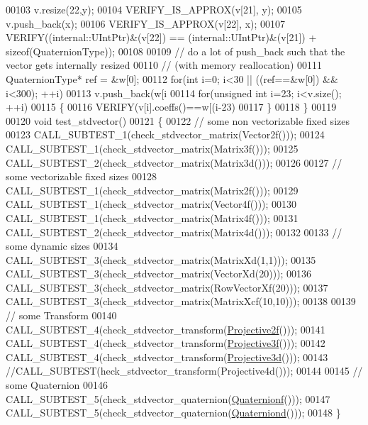 \begin{DoxyCode}
00103   v.resize(22,y);
00104   VERIFY\_IS\_APPROX(v[21], y);
00105   v.push\_back(x);
00106   VERIFY\_IS\_APPROX(v[22], x);
00107   VERIFY((internal::UIntPtr)&(v[22]) == (internal::UIntPtr)&(v[21]) + \textcolor{keyword}{sizeof}(QuaternionType));
00108 
00109   \textcolor{comment}{// do a lot of push\_back such that the vector gets internally resized}
00110   \textcolor{comment}{// (with memory reallocation)}
00111   QuaternionType* ref = &w[0];
00112   \textcolor{keywordflow}{for}(\textcolor{keywordtype}{int} i=0; i<30 || ((ref==&w[0]) && i<300); ++i)
00113     v.push\_back(w[i%
00114   \textcolor{keywordflow}{for}(\textcolor{keywordtype}{unsigned} \textcolor{keywordtype}{int} i=23; i<v.size(); ++i)
00115   \{
00116     VERIFY(v[i].coeffs()==w[(i-23)%
00117   \}
00118 \}
00119 
00120 \textcolor{keywordtype}{void} test\_stdvector()
00121 \{
00122   \textcolor{comment}{// some non vectorizable fixed sizes}
00123   CALL\_SUBTEST\_1(check\_stdvector\_matrix(Vector2f()));
00124   CALL\_SUBTEST\_1(check\_stdvector\_matrix(Matrix3f()));
00125   CALL\_SUBTEST\_2(check\_stdvector\_matrix(Matrix3d()));
00126 
00127   \textcolor{comment}{// some vectorizable fixed sizes}
00128   CALL\_SUBTEST\_1(check\_stdvector\_matrix(Matrix2f()));
00129   CALL\_SUBTEST\_1(check\_stdvector\_matrix(Vector4f()));
00130   CALL\_SUBTEST\_1(check\_stdvector\_matrix(Matrix4f()));
00131   CALL\_SUBTEST\_2(check\_stdvector\_matrix(Matrix4d()));
00132 
00133   \textcolor{comment}{// some dynamic sizes}
00134   CALL\_SUBTEST\_3(check\_stdvector\_matrix(MatrixXd(1,1)));
00135   CALL\_SUBTEST\_3(check\_stdvector\_matrix(VectorXd(20)));
00136   CALL\_SUBTEST\_3(check\_stdvector\_matrix(RowVectorXf(20)));
00137   CALL\_SUBTEST\_3(check\_stdvector\_matrix(MatrixXcf(10,10)));
00138 
00139   \textcolor{comment}{// some Transform}
00140   CALL\_SUBTEST\_4(check\_stdvector\_transform(\hyperlink{group___geometry___module_ga8c0a922ca75a04ef2f6c310dad0a4ab8}{Projective2f}()));
00141   CALL\_SUBTEST\_4(check\_stdvector\_transform(\hyperlink{group___geometry___module_gab14804071b7486b6666f3d324475a478}{Projective3f}()));
00142   CALL\_SUBTEST\_4(check\_stdvector\_transform(\hyperlink{group___geometry___module_gab9cec8c457da930391eb73370e07aaae}{Projective3d}()));
00143   \textcolor{comment}{//CALL\_SUBTEST(heck\_stdvector\_transform(Projective4d()));}
00144 
00145   \textcolor{comment}{// some Quaternion}
00146   CALL\_SUBTEST\_5(check\_stdvector\_quaternion(\hyperlink{group___geometry___module_ga785b13a5a87f9bf55d4eba51ead2dcf0}{Quaternionf}()));
00147   CALL\_SUBTEST\_5(check\_stdvector\_quaternion(\hyperlink{group___geometry___module_ga6e77eb8b6aae0e04be2db88107dbc642}{Quaterniond}()));
00148 \}
\end{DoxyCode}
